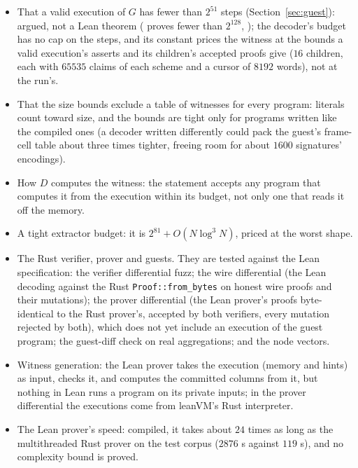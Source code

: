 \documentclass[11pt]{article}
\begin{document}
\begin{itemize}
asks only for some valid execution of $\mathit{prog}$ on $x$, and  decodes that one.
\item That a valid execution of $G$ has fewer than $2^{51}$ steps (Section~\ref{sec:guest}): argued,
not a Lean theorem ( proves fewer than $2^{128}$, ); the
decoder's budget has no cap on the steps, and its constant prices the witness at the bounds a valid
execution's asserts and its children's accepted proofs give ($16$ children, each with $65535$
claims of each scheme and a cursor of $8192$ words), not at the run's.
\item That the size bounds exclude a table of witnesses for every program: literals count toward
size, and the bounds are tight only for programs written like the compiled ones (a decoder
written differently could pack the guest's frame-cell table about three times tighter, freeing
room for about $1600$ signatures' encodings).
\item How $D$ computes the witness: the statement accepts any program that computes it from the
execution within its budget, not only one that reads it off the memory.
\item A tight extractor budget: it is $2^{81} + O(N\log^3 N)$, priced at the worst shape.
\item The Rust verifier, prover and guests. They are tested against the Lean specification: the
verifier differential fuzz; the wire differential (the Lean decoding against the Rust
\texttt{Proof::from\_bytes} on honest wire proofs and their mutations); the prover differential (the Lean prover's proofs byte-identical to the
Rust prover's, accepted by both verifiers, every mutation rejected by both), which does not yet
include an execution of the guest program; the guest-diff check on real aggregations; and the node
vectors.
\item Witness generation: the Lean prover takes the execution (memory and hints) as input, checks
it, and computes the committed columns from it, but nothing in Lean runs a program on its private
inputs; in the prover differential the executions come from leanVM's Rust interpreter.
\item The Lean prover's speed: compiled, it takes about $24$ times as long as the multithreaded
Rust prover on the test corpus ($2876$ s against $119$ s), and no complexity bound is proved.
\end{itemize}
\end{document}

